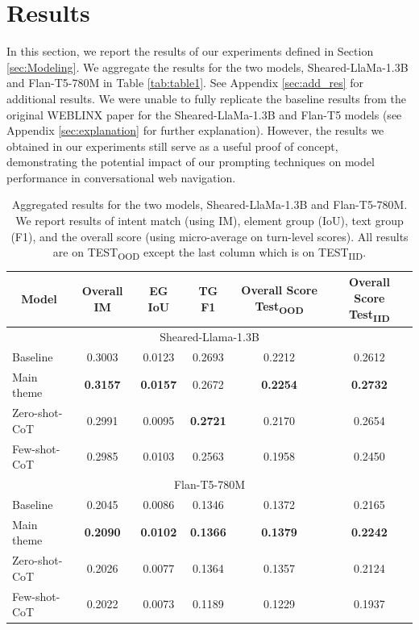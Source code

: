 \documentclass[11pt]{article}
\begin{document}
\section{Results} \label{sec:results}
In this section, we report the results of our experiments defined in Section \ref{sec:Modeling}. We aggregate the results for the two models, Sheared-LlaMa-1.3B and Flan-T5-780M in Table \ref{tab:table1}. See Appendix \ref{sec:add_res} for additional results. We were unable to fully replicate the baseline results from the original WEBLINX paper for the Sheared-LlaMa-1.3B and Flan-T5 models (see Appendix \ref{sec:explanation} for further explanation). However, the results we obtained in our experiments still serve as a useful proof of concept, demonstrating the potential impact of our prompting techniques on model performance in conversational web navigation.

\begin{table}[h]
\caption{Aggregated results for the two models, Sheared-LlaMa-1.3B and Flan-T5-780M. We report results of intent match (using IM), element group (IoU), text group (F1), and the overall score (using micro-average on
turn-level scores). All results are on TEST\textsubscript{OOD} except the last
column which is on TEST\textsubscript{IID}.} 
\label{tab:table1}
\begin{tabular}{|l|c|c|c|c|c|}
\hline
\multicolumn{1}{|c|}{\textbf{Model}} & \multicolumn{1}{c|}{\textbf{Overall IM}} & \multicolumn{1}{c|}{\textbf{EG IoU}}& \multicolumn{1}{c|}{\textbf{TG F1}} & \multicolumn{1}{c|}{\textbf{Overall Score Test\textsubscript{OOD}}} & \multicolumn{1}{c|}{\textbf{Overall Score Test\textsubscript{IID}}} \\
\hline
\multicolumn{6}{|c|}{Sheared-Llama-1.3B}\\
\hline
Baseline & 0.3003 & 0.0123 & 0.2693 & 0.2212 & 0.2612 \\
\hline
Main theme & \textbf{0.3157} & \textbf{0.0157} & 0.2672 & \textbf{0.2254} & \textbf{0.2732} \\
\hline
Zero-shot-CoT & 0.2991 & 0.0095 & \textbf{0.2721} & 0.2170 & 0.2654 \\
\hline
Few-shot-CoT & 0.2985 & 0.0103 & 0.2563 & 0.1958 & 0.2450 \\
\hline
\multicolumn{6}{|c|}{Flan-T5-780M}\\
\hline
Baseline & 0.2045 & 0.0086 & 0.1346 & 0.1372 & 0.2165 \\
\hline
Main theme & \textbf{0.2090} & \textbf{0.0102} & \textbf{0.1366} & \textbf{0.1379} & \textbf{0.2242} \\
\hline
Zero-shot-CoT & 0.2026 & 0.0077 & 0.1364 & 0.1357 & 0.2124 \\
\hline
Few-shot-CoT & 0.2022 & 0.0073 & 0.1189 & 0.1229 & 0.1937 \\
\hline
\end{tabular}
\label{table:model_performance}
\end{table}
\end{document}
